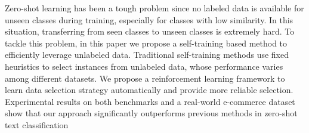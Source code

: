 Zero-shot learning has been a tough problem since no labeled data is available for unseen classes during training, especially for classes with low similarity. In this situation, transferring from seen classes to unseen classes is extremely hard. To tackle this problem, in this paper we propose a self-training based method to efficiently leverage unlabeled data. Traditional self-training methods use fixed heuristics to select instances from unlabeled data, whose performance varies among different datasets. We propose a reinforcement learning framework to learn data selection strategy automatically and provide more reliable selection. Experimental results on both benchmarks and a real-world e-commerce dataset show that our approach significantly outperforms previous methods in zero-shot text classification
